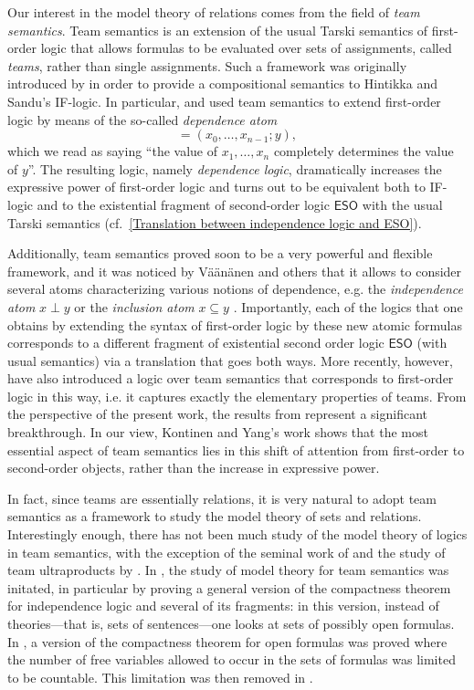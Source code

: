 \documentclass[a4paper]{amsart}
\theoremstyle{definition}
\theoremstyle{remark}
\DeclareMathOperator{\dep}{\mathop{=}}
\newcommand\eso{\mathsf{ESO}}
\theoremstyle{definition}
\begin{document}
Our interest in the model theory of relations comes from the field of \emph{team semantics}. Team semantics is an extension of the usual Tarski semantics of first-order logic that allows formulas to be evaluated over sets of assignments, called \emph{teams}, rather than single assignments. Such a framework was originally introduced by \textcite{Hodges} in order to provide a compositional semantics to Hintikka and Sandu's IF-logic. In particular, \textcite{VAANANEN2010817} and \textcite{Vaananen2007-VNNDLA} used team semantics to extend first-order logic by means of the so-called \emph{dependence atom}
\[
    \dep(x_0,\dots,x_{n-1};y),
\]
which we read as saying ``the value of $x_1,\dots,x_n$ completely determines the value of $y$''. The resulting logic, namely \emph{dependence logic}, dramatically increases the expressive power of first-order logic and turns out to be equivalent both to IF-logic and to the existential fragment of second-order logic $\eso$ with the usual Tarski semantics (cf.~\cref{Translation between independence logic and ESO}).

Additionally, team semantics proved soon to be a very powerful and flexible framework, and it was noticed by Väänänen and others that it allows to consider several atoms characterizing various notions of dependence, e.g. the \emph{independence atom} $x\perp y$ \cite{gradel2013dependence} or the \emph{inclusion atom} $x\subseteq y$ \cite{galliani2012inclusion}. Importantly, each of the logics that one obtains by extending the syntax of first-order logic by these new atomic formulas corresponds to a different fragment of existential second order logic $\eso$ (with usual semantics) via a translation that goes both ways. More recently, however, \textcite{MR4594292} have also introduced a logic over team semantics that corresponds to first-order logic in this way, i.e. it captures exactly the elementary properties of teams. From the perspective of the present work, the results from \cite{MR4594292} represent a significant breakthrough. In our view, Kontinen and Yang's work shows that the most essential aspect of team semantics lies in this shift of attention from first-order to second-order objects, rather than the increase in expressive power.

In fact, since teams are essentially relations, it is very natural to adopt team semantics as a framework to study the model theory of sets and relations. Interestingly enough, there has not been much study of the model theory of logics in team semantics, with the exception of the seminal work of \textcite{Vaananen2007-VNNDLA} and the study of team ultraproducts by \textcite{luck2020team}. In \cite{puljujärvi2022compactness}, the study of model theory for team semantics was initated, in particular by proving a general version of the compactness theorem for independence logic and several of its fragments: in this version, instead of theories---that is, sets of sentences---one looks at sets of possibly open formulas. In \cite{MR4594292}, a version of the compactness theorem for open formulas was proved where the number of free variables allowed to occur in the sets of formulas was limited to be countable. This limitation was then removed in \cite{puljujärvi2022compactness}.
\end{document}
